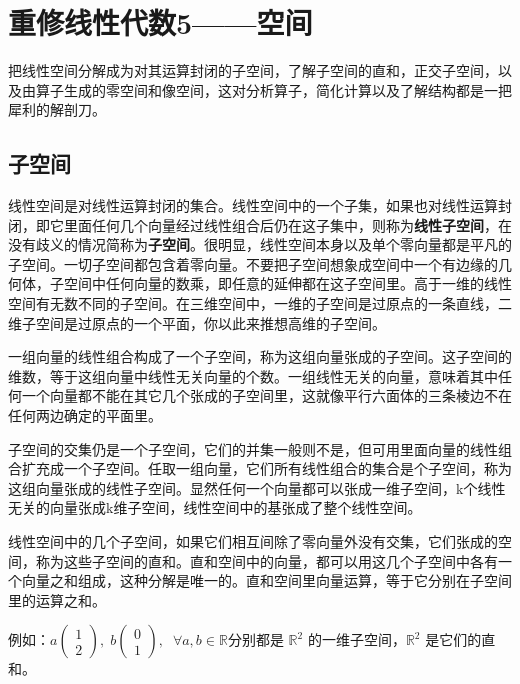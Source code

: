 	\chapter{重修线性代数5——空间}
	把线性空间分解成为对其运算封闭的子空间，了解子空间的直和，正交子空间，以及由算子生成的零空间和像空间，这对分析算子，简化计算以及了解结构都是一把犀利的解剖刀。
	
\section{子空间}
	
	线性空间是对线性运算封闭的集合。线性空间中的一个子集，如果也对线性运算封闭，即它里面任何几个向量经过线性组合后仍在这子集中，则称为\textbf{线性子空间}，在没有歧义的情况简称为\textbf{子空间}。很明显，线性空间本身以及单个零向量都是平凡的子空间。一切子空间都包含着零向量。不要把子空间想象成空间中一个有边缘的几何体，子空间中任何向量的数乘，即任意的延伸都在这子空间里。高于一维的线性空间有无数不同的子空间。在三维空间中，一维的子空间是过原点的一条直线，二维子空间是过原点的一个平面，你以此来推想高维的子空间。
	
	一组向量的线性组合构成了一个子空间，称为这组向量张成的子空间。这子空间的维数，等于这组向量中线性无关向量的个数。一组线性无关的向量，意味着其中任何一个向量都不能在其它几个张成的子空间里，这就像平行六面体的三条棱边不在任何两边确定的平面里。
	
	子空间的交集仍是一个子空间，它们的并集一般则不是，但可用里面向量的线性组合扩充成一个子空间。任取一组向量，它们所有线性组合的集合是个子空间，称为这组向量张成的线性子空间。显然任何一个向量都可以张成一维子空间，k个线性无关的向量张成k维子空间，线性空间中的基张成了整个线性空间。
	
	线性空间中的几个子空间，如果它们相互间除了零向量外没有交集，它们张成的空间，称为这些子空间的直和。直和空间中的向量，都可以用这几个子空间中各有一个向量之和组成，这种分解是唯一的。直和空间里向量运算，等于它分别在子空间里的运算之和。
	
	\kaishu
	
	例如：$ a\begin{pmatrix}1\\2\end{pmatrix},\; b\begin{pmatrix}0\\ 1\end{pmatrix}, \;\; \forall  a,b \in \mathbb{R} $分别都是 $ \mathbb{R}^2 $ 的一维子空间，$ \mathbb{R}^2 $ 是它们的直和。
	
	\songti
	
